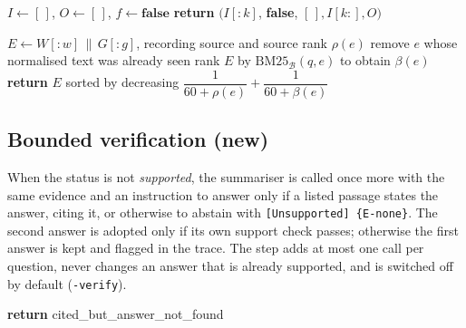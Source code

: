 \begin{algorithm}[!htbp]
\caption{ParseEvidenceIDs}
\label{alg:parse}
$I \leftarrow [\,]$, $O \leftarrow [\,]$, $f \leftarrow \textbf{false}$\;
\textbf{return} $(I[{:}k]$, \textbf{false}, $[\,], I[k{:}], O)$\;
\end{algorithm}

\begin{algorithm}[!htbp]
\caption{BuildPool (evidence governor)}
\label{alg:pool}
$E \leftarrow W[{:}w] \,\|\, G[{:}g]$, recording source and source rank $\rho(e)$\;
remove $e$ whose normalised text was already seen\;
rank $E$ by $\mathrm{BM25}_{\mathcal{B}}(q,e)$ to obtain $\beta(e)$\;
\textbf{return} $E$ sorted by decreasing $\dfrac{1}{60+\rho(e)} + \dfrac{1}{60+\beta(e)}$\;
\end{algorithm}

\subsection{Bounded verification (new)}
When the status is not \emph{supported}, the summariser is called once more with the same evidence and an instruction to answer only if a listed passage states the answer, citing it, or otherwise to abstain with \texttt{[Unsupported] \{E-none\}}. The second answer is adopted only if its own support check passes; otherwise the first answer is kept and flagged in the trace. The step adds at most one call per question, never changes an answer that is already supported, and is switched off by default (\texttt{-verify}).

\begin{algorithm}[!htbp]
\caption{SupportCheck}
\label{alg:support}
\textbf{return} cited\_but\_answer\_not\_found\;
\end{algorithm}

